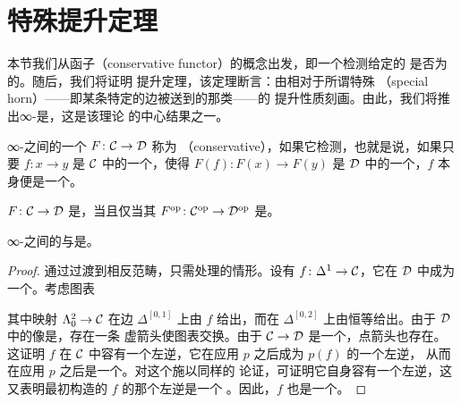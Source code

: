 \section{\trJoyal{}特殊\trHorn{}提升定理}
\label{sec:joyal-special-horn-lifting}

本节我们从\trConservative{}函子（conservative functor）的概念出发，即一个检测给定的%
\trMorphism{}是否为\trEquivalence{}的\trFunctor{}。随后，我们将证明%
\trJoyal{}提升定理，该定理断言：\trConservative{}\trInnerFibration{}由相对于所谓特殊\trHorn{}%
（special horn）——即某条特定的边被送到\trEquivalence{}的那类\trHorn{}——的
提升性质刻画。由此，我们将推出∞-\trGroupoid{}是\trKanComplex{}，这是该理论
的中心结果之一。

\begin{definition}\label{def:conservative-functor}
∞-\trCategories{}之间的一个\trFunctor{} $F\colon \mathcal{C} \to \mathcal{D}$ 称为%
\emph{\trConservative{}}（conservative），如果它检测\trEquivalence{}，也就是说，如果只要
$f\colon x \to y$ 是 $\mathcal{C}$ 中的一个\trMorphism{}，使得 $F(f)\colon F(x) \to F(y)$
是 $\mathcal{D}$ 中的一个\trEquivalence{}，$f$ 本身便是一个\trEquivalence{}。
\end{definition}

\begin{observation}\label{obs:conservative-opposite}
\trFunctor{} $F\colon \mathcal{C} \to \mathcal{D}$ 是\trConservative{}，当且仅当其\trOppositeFunctor{}%
$F^{\mathrm{op}}\colon \mathcal{C}^{\mathrm{op}} \to \mathcal{D}^{\mathrm{op}}$ 是\trConservative{}。
\end{observation}

\begin{proposition}\label{prop:left-right-fibrations-conservative}
∞-\trCategories{}之间的\trLeftFibration{}与\trRightFibration{}是\trConservative{}。
\end{proposition}

\begin{proof}
通过过渡到相反范畴，只需处理\trLeftFibration{}的情形。设有\trMorphism{}%
$f\colon \Delta^1 \to \mathcal{C}$，它在 $\mathcal{D}$ 中成为一个\trEquivalence{}。考虑图表
\begin{center}
\end{center}
其中映射 $\Lambda^2_0 \to \mathcal{C}$ 在边 $\Delta^{[0,1]}$ 上由 $f$ 给出，而在
$\Delta^{[0,2]}$ 上由恒等给出。由于 $\mathcal{D}$ 中的像是\trEquivalence{}，存在一条
虚箭头使图表交换。由于 $\mathcal{C} \to \mathcal{D}$ 是一个\trLeftFibration{}，点箭头也存在。
这证明 $f$ 在 $\mathcal{C}$ 中容有一个左逆，它在应用 $p$ 之后成为 $p(f)$ 的一个左逆，
从而在应用 $p$ 之后是一个\trEquivalence{}。对这个\trMorphism{}施以同样的
论证，可证明它自身容有一个左逆，这又表明最初构造的 $f$ 的那个左逆是一个%
\trEquivalence{}。因此，$f$ 也是一个\trEquivalence{}。
\end{proof}

